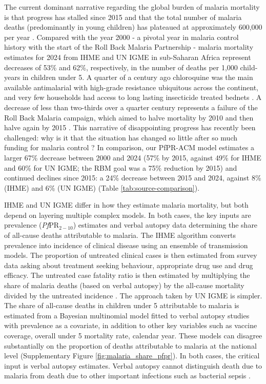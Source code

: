 \documentclass[12pt]{article}
\begin{document}
The current dominant narrative regarding the global burden of malaria mortality is that progress has stalled since 2015 and that the total number of malaria deaths (predominantly in young children) has plateaued at approximately 600,000 per year \cite{wmr,gbd}. 
Compared with the year 2000 - a pivotal year in malaria control history with the start of the Roll Back Malaria Partnership \cite{doi:10.1126/science.280.5372.2067} - malaria mortality estimates for 2024 from IHME and UN IGME in sub-Saharan Africa represent decreases of 53\% and 62\%, respectively, in the number of deaths per 1,000 child-years in children under 5. A quarter of a century ago chloroquine was the main available antimalarial with high-grade resistance ubiquitous across the continent, and very few households had access to long lasting insecticide treated bednets \cite{white_averting}. A decrease of less than two-thirds over a quarter century represents a failure of the Roll Back Malaria campaign, which aimed to halve mortality by 2010 and then halve again by 2015 \cite{doi:10.1126/science.280.5372.2067}. This narrative of disappointing progress has recently been challenged: why is it that the situation has changed so little after so much funding for malaria control \cite{white:22}? In comparison, our PfPR-ACM model estimates a larger 67\% decrease between 2000 and 2024 (57\% by 2015, against 49\% for IHME and 60\% for UN IGME; the RBM goal was a 75\% reduction by 2015) and continued declines since 2015: a 24\% decrease between 2015 and 2024, against 8\% (IHME) and 6\% (UN IGME) (Table \ref{tab:source-comparison}).

IHME and UN IGME differ in how they estimate malaria mortality, but both depend on layering multiple complex models. In both cases, the key inputs are prevalence (\textit{Pf}PR$_{2-10}$) estimates and verbal autopsy data determining the share of all-cause deaths attributable to malaria. The IHME algorithm converts prevalence into incidence of clinical disease using an ensemble of transmission models. The proportion of untreated clinical cases is then estimated from survey data asking about treatment seeking behaviour, appropriate drug use and drug efficacy. The untreated case fatality ratio is then estimated by multiplying the share of malaria deaths (based on verbal autopsy) by the all-cause mortality divided by the untreated incidence \cite{ihme}. The approach taken by UN IGME is simpler. The share of all-cause deaths in children under 5 attributable to malaria is estimated from a Bayesian multinomial model fitted to verbal autopsy studies with prevalence as a covariate, in addition to other key variables such as vaccine coverage, overall under 5 mortality rate, calendar year. These models can disagree substantially on the proportion of deaths attributable to malaria at the national level (Supplementary Figure \ref{fig:malaria_share_pfpr}). In both cases, the critical input is verbal autopsy estimates. Verbal autopsy cannot distinguish death due to malaria from death due to other important infections such as bacterial sepsis \cite{valecha:11}. 
\end{document}
